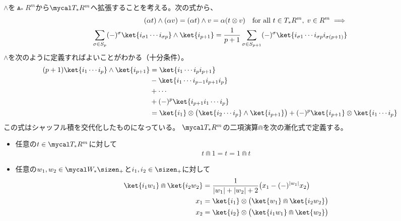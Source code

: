 {	$\wedge$を$\Wedge_*R^m$から$\T_*R^m$へ拡張することを考える。次の式から、
	\begin{equation*}\begin{split}
		(\alpha t)\wedge(\alpha v) = (\alpha t)\wedge v = \alpha(t\otimes v)
		\quad\text{for all } t\in T_*R^m,\; v\in R^m
		\implies \\
		\sum_{\sigma\in S_p} (-)^{\sigma}
			\ket{i_{\sigma1}\cdots i_{\sigma p}}\wedge\ket{i_{p+1}}
		= \frac{1}{p+1}\sum_{\sigma\in S_{p+1}} (-)^{\sigma}
			\ket{i_{\sigma1}\cdots i_{\sigma p}i_{\sigma(p+1)}} \\
	\end{split}\end{equation*}
	$\wedge$を次のように定義すればよいことがわかる（十分条件）。
	\begin{equation*}\begin{split}
		(p + 1) \ket{i_1\cdots i_p}\wedge\ket{i_{p+1}}
		& = \ket{i_1\cdots i_pi_{p+1}} \\
		& - \ket{i_1\cdots i_{p-1}i_{p+1}i_p} \\
		& +\cdots \\
		& + (-)^p \ket{i_{p+1}i_1\cdots i_p} \\
		& = \ket{i_1}\otimes
			\bigl(\ket{i_2\cdots i_p}\wedge\ket{i_{p+1}}\bigr)
			+ (-)^p \ket{i_{p+1}}\otimes\ket{i_1\cdots i_p} \\
	\end{split}\end{equation*}
	この式はシャッフル積を交代化したものになっている。
	$\T_*R^m$の二項演算$\Cap$を次の漸化式で定義する。
	\begin{itemize}\setlength{\itemsep}{-1mm} %
		\item 任意の$t\in\T_*R^m$に対して
		\begin{equation*}\begin{split}
			t\Cap 1 = t = 1\Cap t
		\end{split}\end{equation*}
		\item 任意の$w_1,w_2\in\W_*\sizen_+$と$i_1,i_2\in\sizen_+$に対して
		\begin{equation*}\begin{split}
			\ket{i_1w_1}\Cap\ket{i_2w_2} 
			&= \frac{1}{|w_1| + |w_2| + 2} \bigl(x_1 - (-)^{|w_1|} x_2\bigr) \\
			x_1 &= \ket{i_1}\otimes\bigl(\ket{w_1}\Cap \ket{i_2w_2}\bigr) \\
			x_2 &= \ket{i_2}\otimes\bigl(\ket{i_1w_1}\Cap \ket{w_2}\bigr) \\
		\end{split}\end{equation*}
	\end{itemize} %

}
